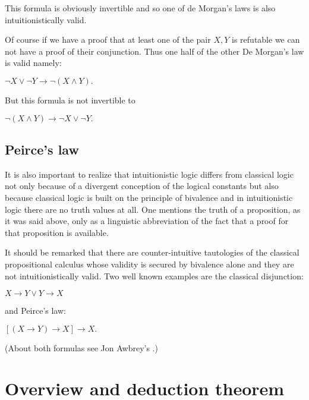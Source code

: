 \documentclass[12pt]{article}
\begin{document}
This formula is obviously invertible and so one of de Morgan's laws is also intuitionistically valid.

Of course if we have a proof that at least one of  the pair $X, Y$ is refutable we can not have a proof of their conjunction. Thus one half of the other De Morgan's law is valid namely:

\begin{center}
$\neg X \vee \neg Y \rightarrow \neg (X \wedge Y).$
\end{center}

But this formula is not invertible to

\begin{center}
$\neg (X \wedge Y) \rightarrow \neg X \vee \neg Y.$
\end{center}

\subsection{Peirce's law}

It is also important to realize that intuitionistic logic differs from classical logic not only because of a divergent conception of the logical constants but also because classical logic is built on the principle of bivalence and in intuitionistic logic there are no truth values at all. One mentions the truth of a proposition, as it was said above,  only as a linguistic abbreviation of the fact that a proof for that proposition is available.
 
It should be remarked that there are counter-intuitive tautologies of the classical propositional calculus whose validity is secured by bivalence alone and they are not intuitionistically valid. Two well known examples are the classical disjunction:

\begin{center}
$X \rightarrow Y \vee Y \rightarrow X$
\end{center}

and Peirce's law:

\begin{center}
$[(X \rightarrow Y) \rightarrow X] \rightarrow X.$
\end{center}

(About both formulas see Jon Awbrey's .)

\section{Overview and deduction theorem}\normalsize
\end{document}

